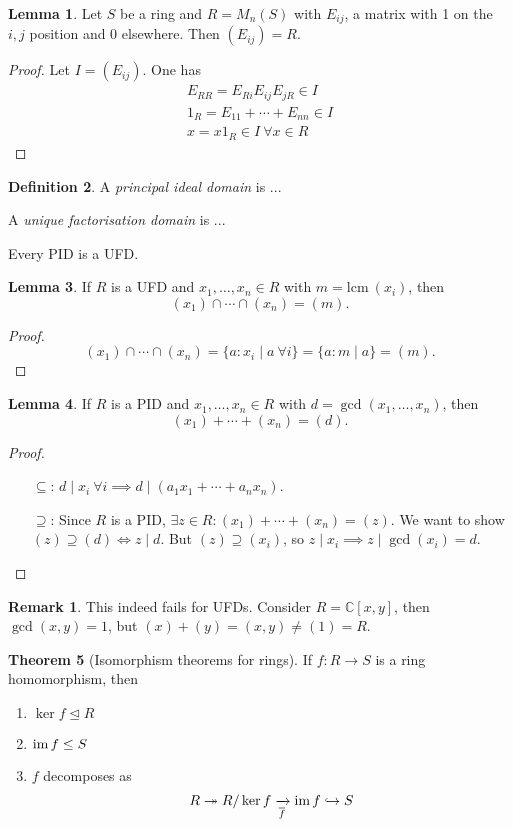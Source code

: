 \documentclass[a4paper]{article}
\newcommand{\C}{\mathbb{C}}
\newcommand{\lcm}{\text{lcm}\ }
\newcommand{\im}{\text{im\,}}
\theoremstyle{definition}
\newtheorem{defn}{Definition}[subsection]
\newtheorem{thm}[defn]{Theorem}
\newtheorem{lemma}[defn]{Lemma}
\newtheorem*{remark}{Remark}
\begin{document}
\begin{lemma}
Let $S$ be a ring and $R=M_n(S)$ with $E_{ij}$, a matrix with 1 on the $i,j$ position and 0 elsewhere. Then $(E_{ij})=R$.
\end{lemma}
\begin{proof}
Let $I=(E_{ij})$. One has
\[
\begin{aligned}
E_{RR}=E_{Ri}E_{ij}E_{jR}\in I\\
1_R=E_{11}+\cdots+E_{nn}\in I \\
x=x1_R\in I \ \forall x\in R
\end{aligned}
\]
\end{proof}

\begin{defn}
A \textit{principal ideal domain} is ...

A \textit{unique factorisation domain} is ...

Every PID is a UFD.
\end{defn}

\begin{lemma}
\label{lemma:intersectingideals}
If $R$ is a UFD and $x_1,\ldots,x_n\in R$ with $m=\lcm(x_i)$, then
\[
(x_1)\cap \cdots \cap (x_n)=(m).
\]
\end{lemma}
\begin{proof}
\[
(x_1)\cap\cdots\cap(x_n)=\{a:x_i\mid a \ \forall i\}=\{a:m\mid a\}=(m).
\]
\end{proof}

\begin{lemma}
If $R$ is a PID and $x_1,\ldots,x_n\in R$ with $d=\gcd(x_1,\ldots,x_n)$, then
\[
(x_1)+\cdots+(x_n)=(d).
\]
\end{lemma}
\begin{proof}
\begin{itemize}
\item[$\subseteq$:] $d\mid x_i \ \forall i\implies d\mid (a_1x_1+\cdots+a_nx_n)$.
\item[$\supseteq$:] Since $R$ is a PID, $\exists z\in R:(x_1)+\cdots+(x_n)=(z)$. We want to show $(z)\supseteq (d)\iff z\mid d$. But $(z)\supseteq (x_i)$, so $z\mid x_i\implies z\mid \gcd(x_i)=d$. 
\end{itemize}
\end{proof}
\begin{remark}
This indeed fails for UFDs. Consider $R=\C[x,y]$, then $\gcd (x,y)=1$, but $(x)+(y)=(x,y)\neq (1)=R$.
\end{remark}

\begin{thm}[Isomorphism theorems for rings]
If $f:R\rightarrow S$ is a ring homomorphism, then
\begin{enumerate}
\item $\ker f\unlhd R$
\item $\im f\leq S$
\item $f$ decomposes as
\[
R\twoheadrightarrow R/\ker f \xrightarrow[\overline{f}]{} \im f \hookrightarrow S
\]
\end{enumerate}
\end{thm}
\end{document}
